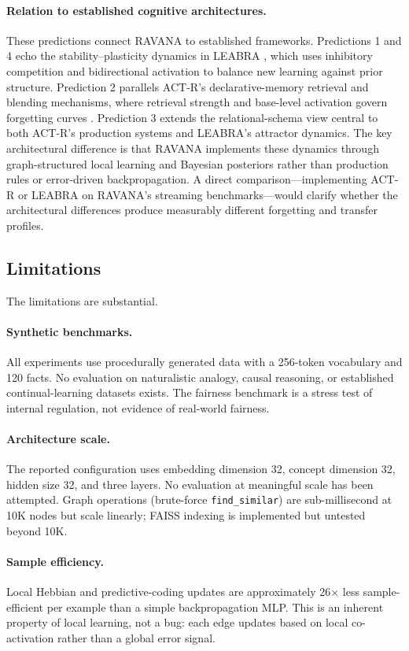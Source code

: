 \documentclass[11pt]{article}
\begin{document}
\paragraph{Relation to established cognitive architectures.}
These predictions connect RAVANA to established frameworks. Predictions 1 and 4 echo the stability--plasticity dynamics in LEABRA \cite{oreilly1996}, which uses inhibitory competition and bidirectional activation to balance new learning against prior structure. Prediction 2 parallels ACT-R's declarative-memory retrieval and blending mechanisms, where retrieval strength and base-level activation govern forgetting curves \cite{anderson2004}. Prediction 3 extends the relational-schema view central to both ACT-R's production systems and LEABRA's attractor dynamics. The key architectural difference is that RAVANA implements these dynamics through graph-structured local learning and Bayesian posteriors rather than production rules or error-driven backpropagation. A direct comparison---implementing ACT-R or LEABRA on RAVANA's streaming benchmarks---would clarify whether the architectural differences produce measurably different forgetting and transfer profiles.

\subsection{Limitations}
The limitations are substantial.

\paragraph{Synthetic benchmarks.}
All experiments use procedurally generated data with a 256-token vocabulary and 120 facts. No evaluation on naturalistic analogy, causal reasoning, or established continual-learning datasets exists. The fairness benchmark is a stress test of internal regulation, not evidence of real-world fairness.

\paragraph{Architecture scale.}
The reported configuration uses embedding dimension 32, concept dimension 32, hidden size 32, and three layers. No evaluation at meaningful scale has been attempted. Graph operations (brute-force \texttt{find\_similar}) are sub-millisecond at 10K nodes but scale linearly; FAISS indexing is implemented but untested beyond 10K.

\paragraph{Sample efficiency.}
Local Hebbian and predictive-coding updates are approximately 26$\times$ less sample-efficient per example than a simple backpropagation MLP. This is an inherent property of local learning, not a bug: each edge updates based on local co-activation rather than a global error signal.
\end{document}
